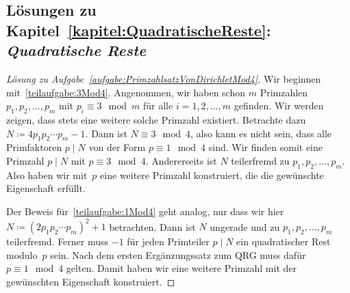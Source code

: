 \subsection*{Lösungen zu Kapitel~\ref{kapitel:QuadratischeReste}: \emph{Quadratische Reste}}

\begin{proof}[Lösung zu Aufgabe~\ref{aufgabe:PrimzahlsatzVonDirichletMod4}]
	Wir beginnen mit~\ref{teilaufgabe:3Mod4}. Angenommen, wir haben schon $m$ Primzahlen $p_1,p_2,\dotsc,p_m$ mit $p_i\equiv 3\mod m$ für alle $i=1,2,\dotsc,m$ gefinden. Wir werden zeigen, dass stets eine weitere solche Primzahl existiert. Betrachte dazu $N\coloneqq 4p_1p_2\dotsm p_m-1$. Dann ist $N\equiv 3\mod 4$, also kann es nicht sein, dass alle Primfaktoren $p\mid N$ von der Form $p\equiv 1\mod 4$ sind. Wir finden somit eine Primzahl $p\mid N$ mit $p\equiv 3\mod 4$. Andererseits ist $N$ teilerfremd zu $p_1,p_2,\dotsc,p_m$. Also haben wir mit~$p$ eine weitere Primzahl konstruiert, die die gewünschte Eigenschaft erfüllt.
	
	Der Beweis für~\ref{teilaufgabe:1Mod4} geht analog, nur dass wir hier $N\coloneqq (2p_1p_2\dotsm p_m)^2+1$ betrachten. Dann ist $N$ ungerade und zu $p_1,p_2,\dotsc,p_m$ teilerfremd. Ferner muss $-1$ für jeden Primteiler $p\mid N$ ein quadratischer Rest modulo~$p$ sein. Nach dem ersten Ergänzungssatz zum QRG muss dafür $p\equiv 1\mod 4$ gelten. Damit haben wir eine weitere Primzahl mit der gewünschten Eigenschaft konstruiert.
\end{proof}

